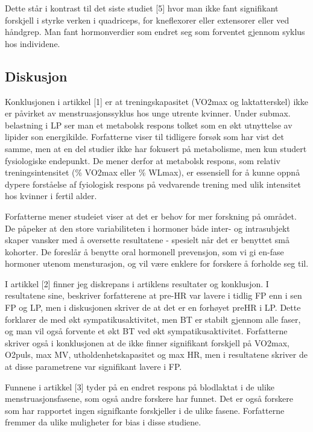 \documentclass[
  letterpaper,
  DIV=11,
  numbers=noendperiod]{scrreprt}
\begin{document}
Dette står i kontrast til det siste studiet {[}5{]} hvor man ikke fant
signifikant forskjell i styrke verken i quadriceps, for kneflexorer
eller extensorer eller ved håndgrep. Man fant hormonverdier som endret
seg som forventet gjennom syklus hos individene.

\hypertarget{diskusjon-1}{%
\subsection{Diskusjon}\label{diskusjon-1}}

Konklusjonen i artikkel {[}1{]} er at treningskapasitet (VO2max og
laktatterskel) ikke er påvirket av menstruasjonssyklus hos unge utrente
kvinner. Under submax. belastning i LP ser man et metabolsk respons
tolket som en økt utnyttelse av lipider son energikilde. Forfatterne
viser til tidligere forsøk som har vist det samme, men at en del studier
ikke har fokusert på metabolisme, men kun studert fysiologiske
endepunkt. De mener derfor at metabolsk respons, som relativ
treningsintensitet (\% VO2max eller \% WLmax), er essensiell for å kunne
oppnå dypere forståelse af fyiologisk respons på vedvarende trening med
ulik intensitet hos kvinner i fertil alder.

Forfatterne mener studeiet viser at det er behov for mer forskning på
området. De påpeker at den store variabiliteten i hormoner både inter-
og intrasubjekt skaper vansker med å oversette resultatene - spesielt
når det er benyttet små kohorter. De foreslår å benytte oral hormonell
prevensjon, som vi gi en-fase hormoner utenom mensturasjon, og vil være
enklere for forskere å forholde seg til.

I artikkel {[}2{]} finner jeg diskrepans i artiklens resultater og
konklusjon. I resultatene sine, beskriver forfatterene at pre-HR var
lavere i tidlig FP enn i sen FP og LP, men i diskusjonen skriver de at
det er en forhøyet preHR i LP. Dette forklarer de med økt
sympatikusaktivitet, men BT er stabilt gjennom alle faser, og man vil
også forvente et økt BT ved økt sympatikusaktivitet. Forfatterne skriver
også i konklusjonen at de ikke finner signifikant forskjell på VO2max,
O2puls, max MV, utholdenhetskapasitet og max HR, men i resultatene
skriver de at disse parametrene var signifikant lavere i FP.

Funnene i artikkel {[}3{]} tyder på en endret respons på blodlaktat i de
ulike menstruasjonsfasene, som også andre forskere har funnet. Det er
også forskere som har rapportet ingen signifkante forskjeller i de ulike
fasene. Forfatterne fremmer da ulike muligheter for bias i disse
studiene.
\end{document}
